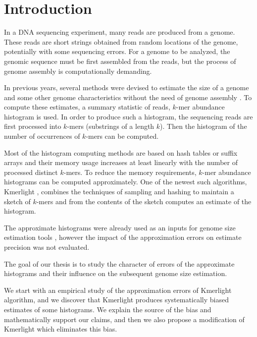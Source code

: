 \chapter*{Introduction}

In a DNA sequencing experiment, many reads are produced from a genome.
These reads are short strings obtained from random locations of the genome,
potentially with some sequencing errors.
For a genome to be analyzed, the genomic sequence must be first assembled from the reads,
but the process of genome assembly is computationally demanding.

In previous years, several methods were devised to estimate
the size of a genome and some other genome characteristics
without the need of genome assembly \cite{Hozza2015, Williams2013, Melsted2014,
Sivadasan2016}. To compute these estimates,
a summary statistic of reads, $k$-mer abundance histogram is used.
In order to produce such a histogram, the sequencing reads are first processed into $k$-mers 
(substrings of a length $k$). Then the histogram of the number of occurrences of $k$-mers
can be computed. 

Most of the histogram computing methods are based on hash tables or suffix arrays 
\cite{Melsted2011, Marcais2011, Rizk2013, Kurtz2008} and
their memory usage increases at least linearly with the number of processed distinct $k$-mers. 
To reduce the memory requirements, $k$-mer abundance histograms can be computed approximately.
One of the newest such algorithms, Kmerlight \cite{Sivadasan2016}, combines the
techniques of sampling and hashing to maintain a sketch of $k$-mers 
and from the contents of the sketch computes an estimate of the histogram.

The approximate histograms were already used as an inputs for genome size estimation tools
\cite{Sivadasan2016}, however the impact of the approximation errors on estimate
precision was not evaluated.

\medskip

The goal of our thesis is to study the character of errors of the approximate histograms
and their influence on the subsequent genome size estimation.

We start with an empirical study of the approximation errors of Kmerlight algorithm, and
we discover that Kmerlight produces systematically biased estimates of some histograms.
We explain the source of the bias and mathematically support our claims, and then
we also propose a modification of Kmerlight which eliminates this bias.

